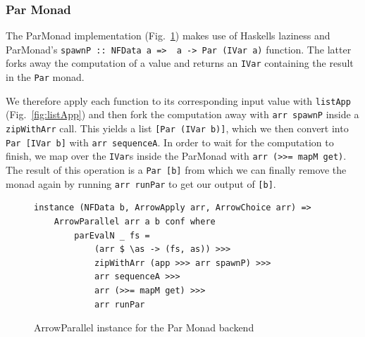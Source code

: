 \documentclass{jfp1}
\newcommand{\inlinecode}[1]{\texttt{#1}}
\begin{document}
\subsubsection{Par Monad}
The ParMonad implementation (Fig.~\ref{fig:ArrowParallelParMonad}) makes use of Haskells laziness and ParMonad's \inlinecode{spawnP :: NFData a =>\ \ a -> Par (IVar a)} function. The latter forks away the computation of a value and returns an \inlinecode{IVar} containing the result in the \inlinecode{Par} monad.


We therefore apply each function to its corresponding input value with \inlinecode{listApp} (Fig.~\ref{fig:listApp}) and then fork the computation away with \inlinecode{arr spawnP} inside a \inlinecode{zipWithArr} call. This yields a list \inlinecode{[Par (IVar b)]}, which we then convert into \inlinecode{Par [IVar b]} with \inlinecode{arr sequenceA}. In order to wait for the computation to finish, we map over the \inlinecode{IVar}s inside the ParMonad with \inlinecode{arr (>>= mapM get)}. The result of this operation is a \inlinecode{Par [b]} from which we can finally remove the monad again by running \inlinecode{arr runPar} to get our output of \inlinecode{[b]}.
\begin{figure}[h]
\begin{lstlisting}[frame=htrbl]
instance (NFData b, ArrowApply arr, ArrowChoice arr) =>
	ArrowParallel arr a b conf where
		parEvalN _ fs = 
			(arr $ \as -> (fs, as)) >>>
			zipWithArr (app >>> arr spawnP) >>>
			arr sequenceA >>>
			arr (>>= mapM get) >>>
			arr runPar
\end{lstlisting} %
\caption{ArrowParallel instance for the Par Monad backend}
\label{fig:ArrowParallelParMonad}
\end{figure}
\end{document}
